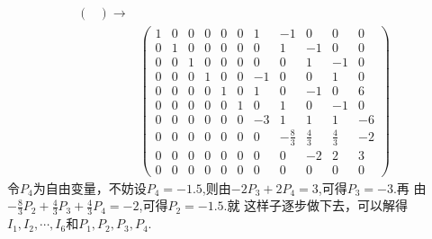 ﻿\documentclass{book} \usepackage{exsheets} \usepackage{xeCJK}
\begin{document}
\begin{solution}
\begin{align*}
\begin{pmatrix}
                                                                \end{pmatrix}\to\\&
                                                                                    \begin{pmatrix}
                                                                                      1&0&0&0&0&0&1&-1&0&0&0\\
                                                                                      0&1&0&0&0&0&0&1&-1&0&0\\
                                                                                      0&0&1&0&0&0&0&0&1&-1&0\\
                                                                                      0&0&0&1&0&0&-1&0&0&1&0\\
                                                                                      0&0&0&0&1&0&1&0&-1&0&6\\
                                                                                      0&0&0&0&0&1&0&1&0&-1&0\\
                                                                                      0&0&0&0&0&0&-3&1&1&1&-6\\
                                                                                      0&0&0&0&0&0&0&-\frac{8}{3}&\frac{4}{3}&\frac{4}{3}&-2\\
                                                                                      0&0&0&0&0&0&0&0&-2&2&3\\
                                                                                      0&0&0&0&0&0&0&0&0&0&0
                                                                                    \end{pmatrix}
\end{align*}
令$P_4$为自由变量，不妨设$P_4=-1.5$,则由$-2P_3+2P_4=3$,可得$P_3=-3$.再
由$-\frac{8}{3}P_2+\frac{4}{3}P_3+\frac{4}{3}P_4=-2$,可得$P_2=-1.5$.就
这样子逐步做下去，可以解得$I_1,I_2,\cdots,I_6$和$P_1,P_2,P_3,P_4$.
\end{solution}
\end{document}
